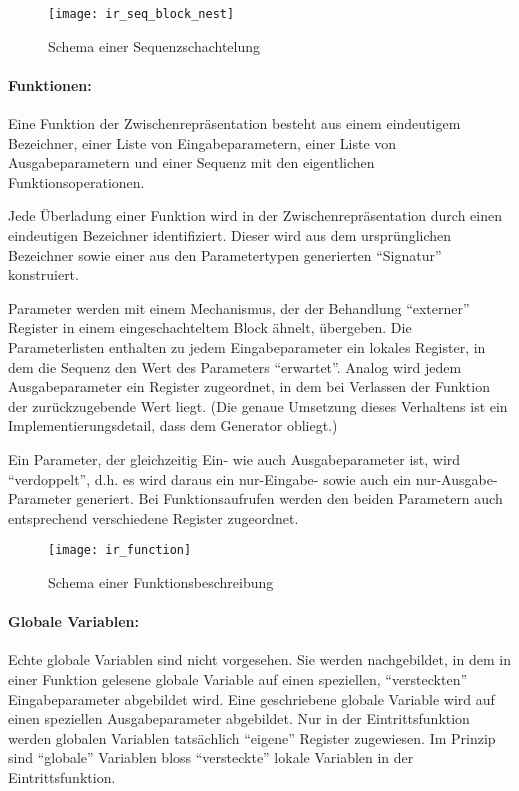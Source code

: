 \documentclass[twoside,a4paper,fleqn,12pt]{article}
\begin{document}
\begin{figure}[h]
   \centering
  \texttt{[image: ir\_seq\_block\_nest]}
  \caption{Schema einer Sequenzschachtelung}
  \label{fig:ir_seq_block_nest}
\end{figure}

\paragraph{Funktionen:}
Eine Funktion der Zwischenrepräsentation besteht aus einem eindeutigem Bezeichner, einer Liste von Eingabeparametern,
einer Liste von Ausgabeparametern und einer Sequenz mit den eigentlichen Funktionsoperationen.

Jede Überladung einer Funktion wird in der Zwischenrepräsentation durch einen eindeutigen Bezeichner identifiziert.
Dieser wird aus dem ursprünglichen Bezeichner sowie einer aus den Parametertypen generierten "`Signatur"' konstruiert.

Parameter werden mit einem Mechanismus, der der Behandlung "`externer"' Register in einem eingeschachteltem
Block ähnelt, übergeben. Die Parameterlisten enthalten zu jedem Eingabeparameter ein lokales Register, in dem die
Sequenz den Wert des Parameters "`erwartet"'. Analog wird jedem Ausgabeparameter ein Register zugeordnet,
in dem bei Verlassen der Funktion der zurückzugebende Wert liegt.
(Die genaue Umsetzung dieses Verhaltens ist ein Implementierungsdetail, dass dem Generator obliegt.)

Ein Parameter, der gleichzeitig Ein- wie auch Ausgabeparameter ist, wird "`verdoppelt"', d.h. es wird daraus
ein nur-Eingabe- sowie auch ein nur-Ausgabe-Parameter generiert. Bei Funktionsaufrufen werden den beiden
Parametern auch entsprechend verschiedene Register zugeordnet.

\begin{figure}[h]
   \centering
  \texttt{[image: ir\_function]}
  \caption{Schema einer Funktionsbeschreibung}
  \label{fig:ir_function}
\end{figure}

\paragraph{Globale Variablen:}
Echte globale Variablen sind nicht vorgesehen. Sie werden nachgebildet, in dem in einer Funktion gelesene globale Variable
auf einen speziellen, "`versteckten"' Eingabeparameter abgebildet wird. Eine geschriebene globale Variable wird
auf einen speziellen Ausgabeparameter abgebildet. Nur in der Eintrittsfunktion werden globalen Variablen tatsächlich
"`eigene"' Register zugewiesen. Im Prinzip sind "`globale"' Variablen bloss "`versteckte"' lokale Variablen in
der Eintrittsfunktion.
\end{document}
